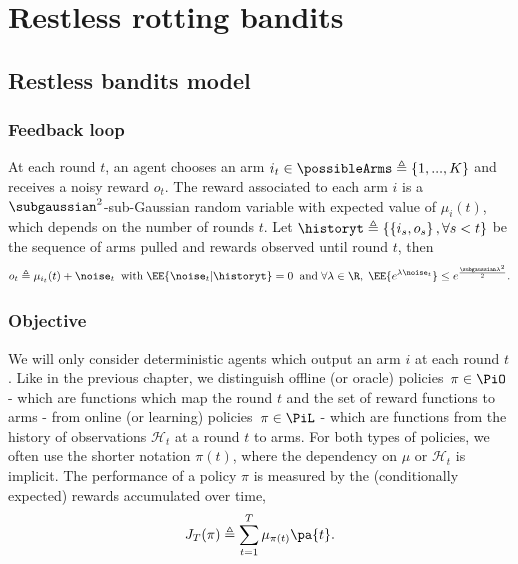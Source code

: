 \section{Restless rotting  bandits}
\label{sec:restless-model}
\subsection{Restless bandits model}
\subsubsection*{Feedback loop}
At each round $t$, an agent chooses an arm $i_t \in \possibleArms \triangleq \left\{ 1, ... , K\right\} $ and receives a noisy reward $o_t$. The reward associated to each arm $i$ is a $\subgaussian^2$-sub-Gaussian random variable with expected value of $\mu_i(t)$, which depends on the number of rounds $t$. Let $\historyt \triangleq \left\{ \left\{ i_s, o_s \right\}, \forall s < t \right\}$ be the sequence of arms pulled and rewards observed until round $t$, then 
%
\begin{equation}
\label{eq:restless-feedback}
o_{t} \triangleq \mu_{i_t}(t) + \noise_t
 \;\; \text{with}\; \EE{ \noise_t | \historyt }= 0 \;\; \text{and} \; \forall \lambda \in \R, \; \EE{ e^{\lambda\noise_t}} \leq e^{\frac{\subgaussian\lambda^2}{2}}.
\end{equation}
%

\subsubsection*{Objective}
We will only consider deterministic agents which output an arm $i$ at each round $t$. Like in the previous chapter, we distinguish offline (or oracle) policies~$\pi \in \PiO$ - which are functions which map the round $t$ and the set of reward functions to arms - from online (or learning) policies~$\pi \in \PiL$ - which are functions from the history of observations $\mathcal{H}_t$ at a round $t$ to arms. For both types of policies, we often use the shorter notation $\pi(t)$, where the dependency on $\mu$ or $\mathcal{H}_t$ is implicit. The performance of a policy $\pi$ is measured by the (conditionally expected) rewards accumulated over time, 
%
\begin{equation}
\label{eq:cumul-reward-restless}
J_T(\pi) \triangleq \sum_{t=1}^T \mu_{\pi(t)}\pa{t}.
\end{equation}
%

